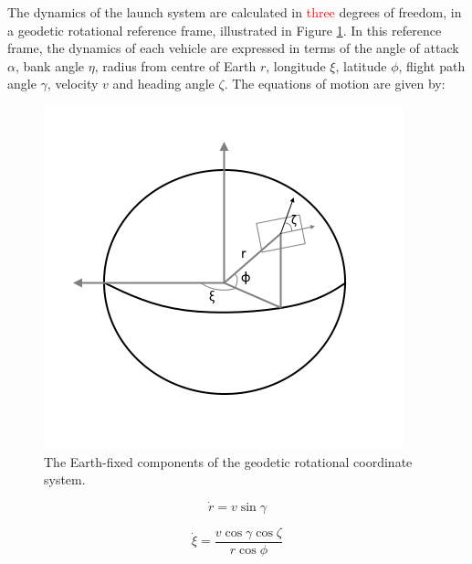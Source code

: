 The dynamics of the launch system are calculated in \textcolor{red}{three} degrees of freedom, in a geodetic rotational reference frame, illustrated in Figure \ref{fig:global}. In this reference frame, the dynamics of each vehicle are expressed in terms of the angle of attack $\alpha$, bank angle $\eta$, radius from centre of Earth $r$, longitude $\xi$, latitude $\phi$, flight path angle $\gamma$, velocity $v$ and heading angle $\zeta$. The equations of motion are given by\cite{Josselyn2002a}:
\begin{figure}[ht]
	\centering
	\includegraphics[width=0.7\linewidth]{figures/4_LODESTAR/global}
	\caption{The Earth-fixed components of the geodetic rotational coordinate system.}
	\label{fig:global}
\end{figure}


\begin{equation}
\dot{r} = v \sin \gamma
\end{equation}

\begin{equation}
\dot{\xi} = \frac{v\cos \gamma \cos \zeta}{r \cos \phi}
\end{equation}

